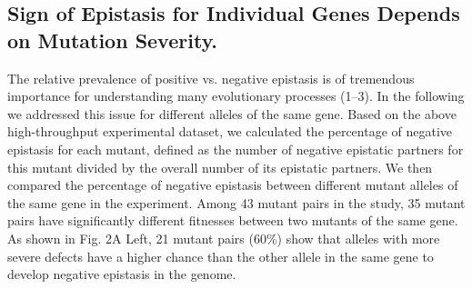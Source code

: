\subsection{Sign of Epistasis for Individual Genes Depends on Mutation
Severity.}

The relative prevalence of positive vs. negative epistasis is of
tremendous importance for understanding many evolutionary processes
(1–3). In the following we addressed this issue for different alleles
of the same gene. Based on the above high-throughput experimental
dataset, we calculated the percentage of negative epistasis for each
mutant, defined as the number of negative epistatic partners for this
mutant divided by the overall number of its epistatic partners. We
then compared the percentage of negative epistasis between different
mutant alleles of the same gene in the experiment. Among 43 mutant
pairs in the study, 35 mutant pairs have significantly different
fitnesses between two mutants of the same gene. As shown in Fig. 2A
Left, 21 mutant pairs (60\%) show that alleles with more severe
defects have a higher chance than the other allele in the same gene to
develop negative epistasis in the genome.

